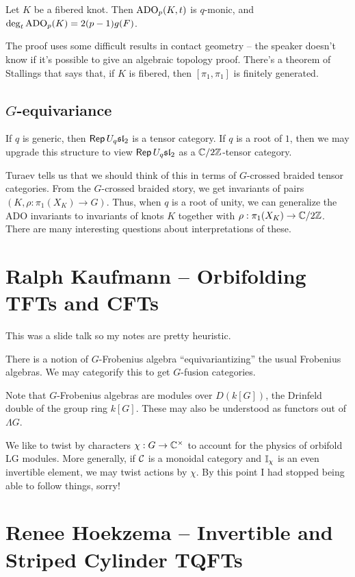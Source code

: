 \documentclass{amsart}
\begin{document}
\begin{thm}[LN-vdV 2024]
  Let $K$ be a fibered knot.
  Then $\operatorname{ADO}_p(K, t)$ is $q$-monic, and $\deg_t \operatorname{ADO}_p(K) = 2 (p-1) g(F)$.
\end{thm}

The proof uses some difficult results in contact geometry -- the speaker doesn't know if it's possible to give an algebraic topology proof.
There's a theorem of Stallings that says that, if $K$ is fibered, then $[\pi_1, \pi_1]$ is finitely generated.

\subsection{$G$-equivariance}

If $q$ is generic, then $\operatorname{\mathsf{Rep}} U_q \mathfrak{sl}_2$ is a tensor category.
If $q$ is a root of $1$, then we may upgrade this structure to view $\operatorname{\mathsf{Rep}} U_q \mathfrak{sl}_2$ as a $\mathbb{C} / 2 \mathbb{Z}$-tensor category.

Turaev tells us that we should think of this in terms of $G$-crossed braided tensor categories.
From the $G$-crossed braided story, we get invariants of pairs $(K, \rho: \pi_1(X_K) \to G)$.
Thus, when $q$ is a root of unity, we can generalize the ADO invariants to invariants of knots $K$ together with $\rho: \pi_1(X_K) \to \mathbb{C} / 2\mathbb{Z}$.
There are many interesting questions about interpretations of these.

\section{Ralph Kaufmann -- Orbifolding TFTs and CFTs}

This was a slide talk so my notes are pretty heuristic.

There is a notion of $G$-Frobenius algebra ``equivariantizing'' the usual Frobenius algebras.
We may categorify this to get $G$-fusion categories.

Note that $G$-Frobenius algebras are modules over $D(k[G])$, the Drinfeld double of the group ring $k[G]$.
These may also be understood as functors out of $\Lambda G$.

We like to twist by characters $\chi: G \to \mathbb{C}^\times$ to account for the physics of orbifold LG modules.
More generally, if $\mathcal{C}$ is a monoidal category and $\mathbb{I}_\chi$ is an even invertible element, we may twist actions by $\chi$.
By this point I had stopped being able to follow things, sorry!

\section{Renee Hoekzema -- Invertible and Striped Cylinder TQFTs}
\end{document}

